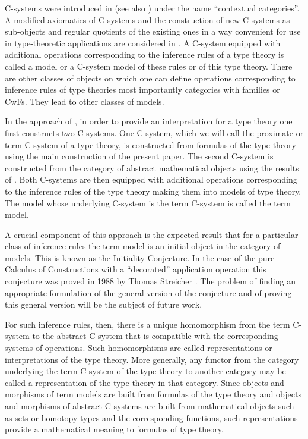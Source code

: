\documentclass[12pt]{amsart}
\begin{document}
C-systems were introduced in \cite{Cartmell0} (see also \cite{Cartmell1}) under the name ``contextual categories''. A modified axiomatics of C-systems and the construction of new C-systems as sub-objects and regular quotients of the existing ones in a way convenient for use in type-theoretic applications are considered in \cite{Csubsystems}. A C-system equipped with additional operations corresponding to the inference rules of a type theory is called a model or a C-system model of these rules or of this type theory. There are other classes of objects on which one can define operations corresponding to inference rules of type theories most importantly categories with families or CwFs. They lead to other classes of models.  

In the approach of \cite{CMUtalk}, in order to provide an interpretation for a type theory one first constructs two C-systems. One C-system, which we will call the proximate or term C-system of a type theory, is constructed from formulas of the type theory using the main  construction of the present paper.  The second C-system is constructed from the category of abstract mathematical objects using the results of \cite{Cfromauniverse}. Both C-systems are then equipped with additional operations corresponding to the inference rules of the type theory making them into models of type theory.  The model whose underlying C-system is the term C-system is called the term model. 

A crucial component of this approach is the expected result that for a particular class of inference rules the term model is an initial object in the category of models. This is known as the Initiality Conjecture. In the case of the pure Calculus of Constructions with a ``decorated''  application operation this conjecture was proved in 1988 by Thomas Streicher \cite{Streicher}. The problem of finding an appropriate formulation of the general version of the conjecture and of proving this general version will be the subject of future work. 

For such inference rules, then, there is a unique homomorphism from the term C-system to the abstract C-system that is compatible with the corresponding systems of operations. Such homomorphisms are called representations or interpretations of the type theory. More generally, any functor from the category underlying the term C-system of the type theory to another category may be called a representation of the type theory in that category. Since objects and morphisms of term models are built from formulas of the type theory and objects and morphisms of abstract C-systems are built from mathematical objects such as sets or homotopy types and the corresponding functions, such representations provide a mathematical meaning to formulas of type theory. 
\end{document}
